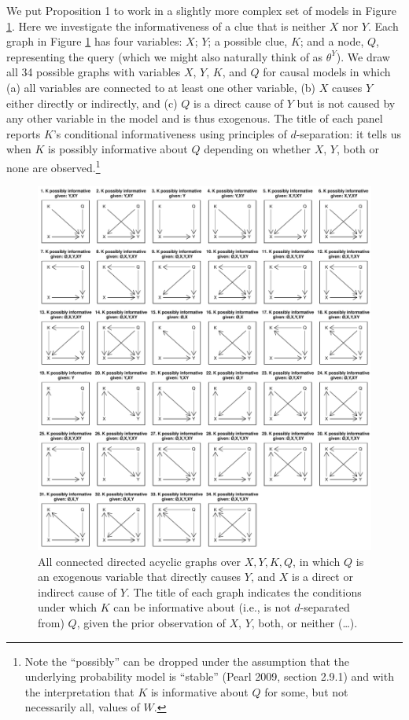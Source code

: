 \documentclass[
  12pt,
]{book}
\begin{document}
We put Proposition 1 to work in a slightly more complex set of models in Figure \ref{fig:34graphs}. Here we investigate the informativeness of a clue that is neither \(X\) nor \(Y\). Each graph in Figure \ref{fig:34graphs} has four variables: \(X\); \(Y\); a possible clue, \(K\); and a node, \(Q\), representing the query (which we might also naturally think of as \(\theta^Y\)). We draw all 34 possible graphs with variables \(X\), \(Y\), \(K\), and \(Q\) for causal models in which (a) all variables are connected to at least one other variable, (b) \(X\) causes \(Y\) either directly or indirectly, and (c) \(Q\) is a direct cause of \(Y\) but is not caused by any other variable in the model and is thus exogenous. The title of each panel reports \(K\)'s conditional informativeness using principles of \(d\)-separation: it tells us when \(K\) is possibly informative about \(Q\) depending on whether \(X\), \(Y\), both or none are observed.\footnote{Note the ``possibly'' can be dropped under the assumption that the underlying probability model is ``stable'' (Pearl 2009, section 2.9.1) and with the interpretation that \(K\) is informative about \(Q\) for some, but not necessarily all, values of \(W\).}

\begin{figure}
\centering
\includegraphics{ii_files/figure-latex/34graphs-1.pdf}
\caption{\label{fig:34graphs}All connected directed acyclic graphs over \(X,Y,K,Q\), in which \(Q\) is an exogenous variable that directly causes \(Y\), and \(X\) is a direct or indirect cause of \(Y\). The title of each graph indicates the conditions under which \(K\) can be informative about (i.e., is not \(d\)-separated from) \(Q\), given the prior observation of \(X\), \(Y\), both, or neither (\ldots).}
\end{figure}
\end{document}
